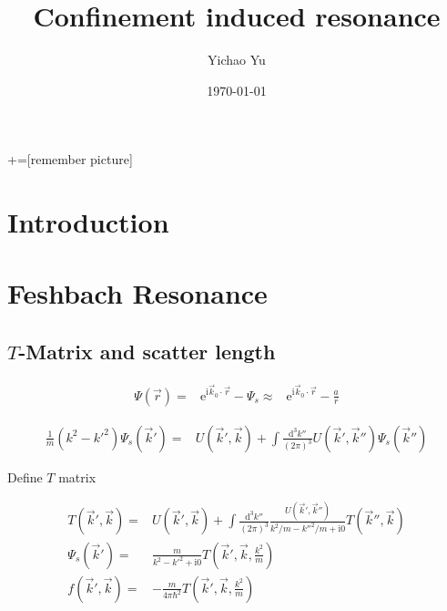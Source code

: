 \documentclass[aps,twocolumn,secnumarabic,balancelastpage,amsmath,amssymb,nofootinbib]{revtex4}
\newcommand{\ud}{\mathrm{d}}
\newcommand{\ue}{\mathrm{e}}
\newcommand{\ui}{\mathrm{i}}
\newcommand{\eqar}[1]
{
  \begin{align*}
    #1
  \end{align*}
}
\newcommand{\paren}[1]{{\left({#1}\right)}}
\begin{document}
+=[remember picture]
\title{Confinement induced resonance}
\author{Yichao Yu}
\date{\today}

\begin{abstract}
\end{abstract}

\maketitle
\section{Introduction}

\section{Feshbach Resonance}
\subsection{$T$-Matrix and scatter length}

\eqar{
  \Psi\paren{\vec r}=&\ue^{\ui \vec k_0\cdot \vec r}-\Psi_{s}
  \approx&\ue^{\ui \vec k_0\cdot \vec r}-\frac{a}{r}
}

\eqar{
  \frac1{m}\paren{k^2-k'^2}\Psi_{s}\paren{\vec k'}=&U\paren{\vec k', \vec k}+\int\frac{\ud^3 k''}{\paren{2\pi}^3}U\paren{\vec k', \vec k''}\Psi_s\paren{\vec k''}
}

Define $T$ matrix
\eqar{
  T\paren{\vec k', \vec k}=&U\paren{\vec k', \vec k}+\int\frac{\ud^3k''}{\paren{2\pi}^3}\frac{U\paren{\vec k', \vec k''}}{k^2/m-k''^2/m+\ui 0}T\paren{\vec k'', \vec k}\\
  \Psi_s\paren{\vec k'}=&\frac{m}{k^2-k'^2+\ui 0}T\paren{\vec k', \vec k, \frac{k^2}{m}}\\
  f\paren{\vec k', \vec k}=&-\frac{m}{4\pi\hbar^2}T\paren{\vec k', \vec k, \frac{k^2}{m}}
}
\end{document}

